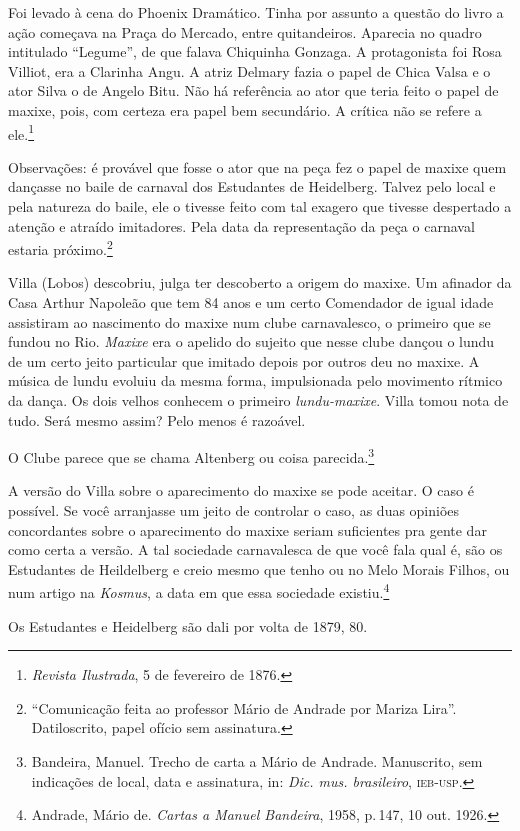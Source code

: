 Foi levado à cena do Phoenix Dramático. Tinha por assunto a questão do
livro a ação começava na Praça do Mercado, entre quitandeiros. Aparecia
no quadro intitulado ``Legume'', de que falava Chiquinha Gonzaga. A
protagonista foi Rosa Villiot, era a Clarinha Angu. A atriz Delmary
fazia o papel de Chica Valsa e o ator Silva o de Angelo Bitu. Não há
referência ao ator que teria feito o papel de maxixe, pois, com certeza
era papel bem secundário. A crítica não se refere a ele.\footnote{\textit{Revista
Ilustrada}, 5 de fevereiro de 1876.}

Observações: é provável que fosse o ator que na peça fez o papel de
maxixe quem dançasse no baile de carnaval dos Estudantes de Heidelberg.
Talvez pelo local e pela natureza do baile, ele o tivesse feito com tal
exagero que tivesse despertado a atenção e atraído imitadores. Pela data
da representação da peça o carnaval estaria próximo.\footnote{``Comunicação
feita ao professor Mário de Andrade por Mariza Lira''. Datiloscrito,
papel ofício sem assinatura.}

Villa (Lobos) descobriu, julga ter descoberto a origem do maxixe. Um
afinador da Casa Arthur Napoleão que tem 84 anos e um certo Comendador
de igual idade assistiram ao nascimento do maxixe num clube
carnavalesco, o primeiro que se fundou no Rio. \textit{Maxixe} era o apelido do
sujeito que nesse clube dançou o lundu de um certo jeito particular que
imitado depois por outros deu no maxixe. A música de lundu evoluiu da
mesma forma, impulsionada pelo movimento rítmico da dança. Os dois
velhos conhecem o primeiro \textit{lundu-maxixe}. Villa tomou nota de tudo. Será mesmo
assim? Pelo menos é razoável.

O Clube parece que se chama Altenberg ou coisa parecida.\footnote{Bandeira,
Manuel. Trecho de carta a Mário de Andrade. Manuscrito, sem indicações
de local, data e assinatura, in: \textit{Dic. mus. brasileiro}, \textsc{ieb-usp}.}

A versão do Villa sobre o aparecimento do maxixe se pode aceitar. O
caso é possível. Se você arranjasse um jeito de controlar o caso, as
duas opiniões concordantes sobre o aparecimento do maxixe seriam
suficientes pra gente dar como certa a versão. A tal sociedade
carnavalesca de que você fala qual é, são os Estudantes de Heildelberg
e creio mesmo que tenho ou no Melo Morais Filhos, ou num artigo na
\textit{Kosmus}, a data em que essa sociedade existiu.\footnote{Andrade, Mário de.
\textit{Cartas a Manuel Bandeira}, 1958, p.\,147, 10 out. 1926.}

Os Estudantes e Heidelberg são dali por volta de 1879, 80.

